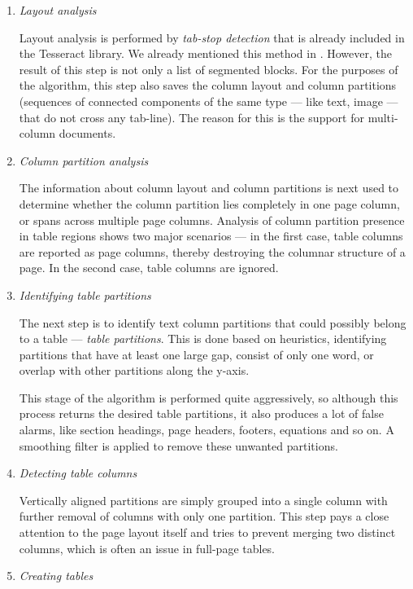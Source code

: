 \begin{enumerate}
\item \emph{Layout analysis}

Layout analysis is performed by \emph{tab-stop detection} that is already included in the Tesseract library. We already mentioned this method in . However, the result of this step is not only a list of segmented blocks. For the purposes of the algorithm, this step also saves the column layout and column partitions (sequences of connected components of the same type --- like text, image --- that do not cross any tab-line). The reason for this is the support for multi-column documents.

\item \emph{Column partition analysis}

The information about column layout and column partitions is next used to determine whether the column partition lies completely in one page column, or spans across multiple page columns. Analysis of column partition presence in table regions shows two major scenarios --- in the first case, table columns are reported as page columns, thereby destroying the columnar structure of a page. In the second case, table columns are ignored.

\item \emph{Identifying table partitions}

The next step is to identify text column partitions that could possibly belong to a table --- \emph{table partitions}. This is done based on heuristics, identifying partitions that have at least one large gap, consist of only one word, or overlap with other partitions along the y-axis.

This stage of the algorithm is performed quite aggressively, so although this process returns the desired table partitions, it also produces a lot of false alarms, like section headings, page headers, footers, equations and so on. A smoothing filter is applied to remove these unwanted partitions.

\item \emph{Detecting table columns}

Vertically aligned partitions are simply grouped into a single column with further removal of columns with only one partition. This step pays a close attention to the page layout itself and tries to prevent merging two distinct columns, which is often an issue in full-page tables.

\item \emph{Creating tables}


\end{enumerate}
